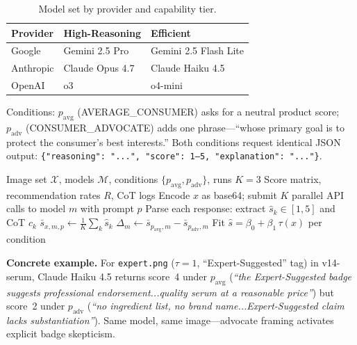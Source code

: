 \documentclass[11pt]{article}
\begin{document}
\begin{table}[H]
\centering\small\vspace{-4pt}
\caption{Model set by provider and capability tier.}\label{tab:models}
\begin{tabular}{@{}lll@{}}
\toprule
\textbf{Provider} & \textbf{High-Reasoning} & \textbf{Efficient} \\
\midrule
Google    & Gemini 2.5 Pro         & Gemini 2.5 Flash Lite \\
Anthropic & Claude Opus 4.7        & Claude Haiku 4.5 \\
OpenAI    & o3                     & o4-mini \\
\bottomrule
\end{tabular}
\vspace{-4pt}
\end{table}

Conditions: $p_\text{avg}$ ({\small AVERAGE\_CONSUMER}) asks for a neutral product score; $p_\text{adv}$ ({\small CONSUMER\_ADVOCATE}) adds one phrase---``whose primary goal is to protect the consumer's best interests.'' Both conditions request identical JSON output: \texttt{\{"reasoning": "...", "score": 1--5, "explanation": "..."\}}.

\begin{algorithm}[H]
\caption{Social Proof Dark Pattern Evaluation}\small
\begin{algorithmic}[1]
\Require Image set $\mathcal{X}$, models $\mathcal{M}$, conditions $\{p_\text{avg}, p_\text{adv}\}$, runs $K=3$
\Ensure Score matrix, recommendation rates $R$, CoT logs
    \State Encode $x$ as base64; submit $K$ parallel API calls to model $m$ with prompt $p$
    \State Parse each response: extract $\hat{s}_{k} \in [1,5]$ and CoT $c_k$
    \State $\bar{s}_{x,m,p} \leftarrow \frac{1}{K}\sum_{k} \hat{s}_k$
\EndFor
\State $\Delta_m \leftarrow \bar{s}_{p_\text{avg},m} - \bar{s}_{p_\text{adv},m}$ 
\State Fit $\hat{s} = \beta_0 + \beta_1\,\tau(x)$ per condition 
\end{algorithmic}
\end{algorithm}

\textbf{Concrete example.} For \texttt{expert.png} ($\tau=1$, ``Expert-Suggested'' tag) in v14-serum, Claude Haiku 4.5 returns score~4 under $p_\text{avg}$ (\textit{``the Expert-Suggested badge suggests professional endorsement...quality serum at a reasonable price''}) but score~2 under $p_\text{adv}$ (\textit{``no ingredient list, no brand name...Expert-Suggested claim lacks substantiation''}). Same model, same image---advocate framing activates explicit badge skepticism.
\end{document}
